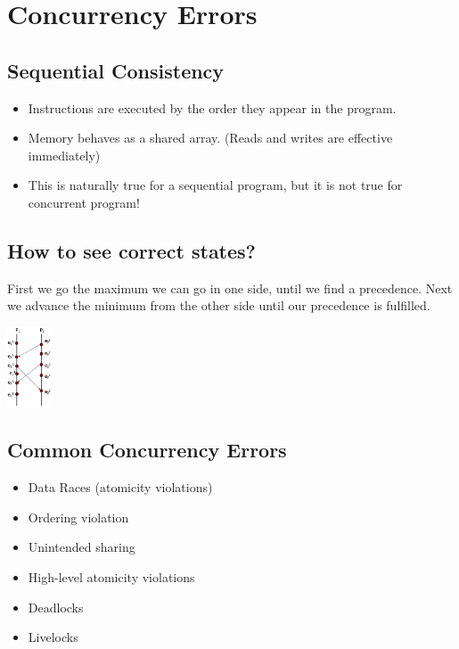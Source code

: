 \section{Concurrency Errors}

\subsection{Sequential Consistency}

\begin{itemize}
    \item Instructions are executed by the order they appear in the program.
    \item Memory behaves as a shared array. (Reads and writes are effective immediately)
    \item This is naturally true for a sequential program, but it is not true for concurrent program!
\end{itemize}

\subsection{How to see correct states?}

First we go the maximum we can go in one side, until we find a precedence. Next we advance the minimum from the other side until our precedence is fulfilled.


\includegraphics[width=0.1\textwidth]{concurrency-errors/gRAPH.png}

\subsection{Common Concurrency Errors}

\begin{itemize}
    \item Data Races (atomicity violations)
    \item Ordering violation
    \item Unintended sharing
    \item High-level atomicity violations
    \item Deadlocks
    \item Livelocks
\end{itemize}

